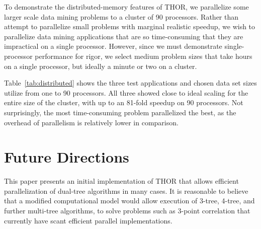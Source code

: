 \documentclass[twoside,leqno,twocolumn]{article}
\newcommand{\fig}[1]{Figure~\ref{fig:#1}}
\newcommand{\tab}[1]{Table~\ref{tab:#1}}
\begin{document}
To demonstrate the distributed-memory features of THOR, we parallelize some larger scale data mining problems to a cluster of 90 processors.
Rather than attempt to parallelize small problems with marginal realistic speedup, we wish to parallelize data mining applications that are so time-consuming that they are impractical on a single processor.
However, since we must demonstrate single-processor performance for rigor, we select medium problem sizes that take hours on a single processor, but ideally a minute or two on a cluster.

\tab{distributed} shows the three test applications and chosen data set sizes utilize from one to 90 processors.
All three showed close to ideal scaling for the entire size of the cluster, with up to an 81-fold speedup on 90 processors.
Not surprisingly, the most time-consuming problem parallelized the best, as the overhead of parallelism is relatively lower in comparison.





\section{Future Directions}

This paper presents an initial implementation of THOR that allows efficient parallelization of dual-tree algorithms in many cases.
It is reasonable to believe that a modified computational model would allow execution of 3-tree, 4-tree, and further multi-tree algorithms, to solve problems such as 3-point correlation that currently have scant efficient parallel implementations.
\end{document}

